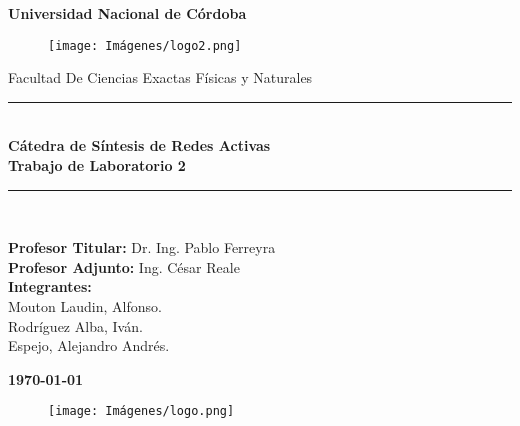 \begin{titlepage}
	
	\begin{center}
		{\LARGE \textbf{Universidad Nacional de Córdoba}}\\
		\begin{figure}[h]
			\centering
			\texttt{[image: Imágenes/logo2.png]}
		\end{figure}
		
		{\large Facultad De Ciencias Exactas Físicas y Naturales}
		
		\rule{\linewidth}{0.3mm}\\
		\vspace{5mm}
		{{\large \textbf{Cátedra de Síntesis de Redes Activas}}}\\
		\vspace{5mm}
		{{\LARGE \textbf{Trabajo de Laboratorio 2}}}
		\rule{\linewidth}{0.3mm}\\
		
		\vspace{10mm}
		
		{\large {\textbf{Profesor Titular:} Dr. Ing. Pablo Ferreyra}\\
        {\textbf{Profesor Adjunto:} Ing. César Reale}\\
		{\textbf{Integrantes:\\} Mouton Laudin, Alfonso.\\Rodríguez Alba, Iván.\\
Espejo, Alejandro Andrés.}\\}
		
		\vspace{10mm}
		
		\textbf{\monthyeardate\today}

        \vspace{10mm}

        \begin{figure}[h]
			\centering
			\texttt{[image: Imágenes/logo.png]}
		\end{figure}
		
	\end{center}
	

\end{titlepage}
